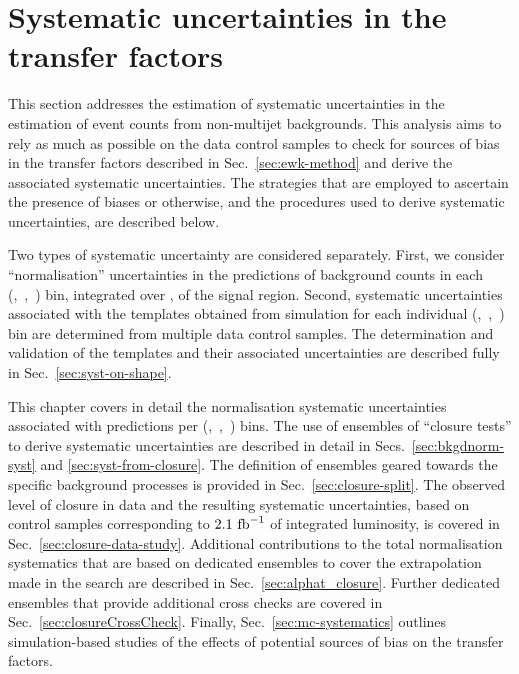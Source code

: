 \section{Systematic uncertainties in the transfer factors}
\label{sec:systematics}

This section addresses the estimation of systematic uncertainties in
the estimation of event counts from non-multijet backgrounds. This
analysis aims to rely as much as possible on the data control samples
to check for sources of bias in the transfer factors described in
Sec.~\ref{sec:ewk-method} and derive the associated systematic
uncertainties. The strategies that are employed to ascertain the
presence of biases or otherwise, and the procedures used to derive
systematic uncertainties, are described below.

Two types of systematic uncertainty are considered separately. First,
we consider ``normalisation'' uncertainties in the predictions of
background counts in each (\njet,~\nb,~\scalht) bin, integrated over
\mht, of the signal region. Second, systematic uncertainties
associated with the \mht templates obtained from simulation for each
individual (\njet,~\nb,~\scalht) bin are determined from multiple data
control samples. The determination and validation of the \mht
templates and their associated uncertainties are described fully in
Sec.~\ref{sec:syst-on-shape}.

This chapter covers in detail the normalisation systematic
uncertainties associated with predictions per (\njet,~\nb,~\scalht)
bins. The use of ensembles of ``closure tests'' to derive systematic
uncertainties are described in detail in Secs.~\ref{sec:bkgdnorm-syst}
and \ref{sec:syst-from-closure}. The definition of ensembles geared
towards the specific background processes is provided in
Sec.~\ref{sec:closure-split}. The observed level of closure in data
and the resulting systematic uncertainties, based on control samples
corresponding to $2.1~\ifb$ of integrated luminosity, is covered in
Sec.~\ref{sec:closure-data-study}. Additional contributions to the
total normalisation systematics that are based on dedicated ensembles
to cover the \alphat extrapolation made in the search are described in
Sec.~\ref{sec:alphat_closure}. Further dedicated ensembles that
provide additional cross checks are covered in
Sec.~\ref{sec:closureCrossCheck}. Finally,
Sec.~\ref{sec:mc-systematics} outlines simulation-based studies of the
effects of potential sources of bias on the transfer factors.

